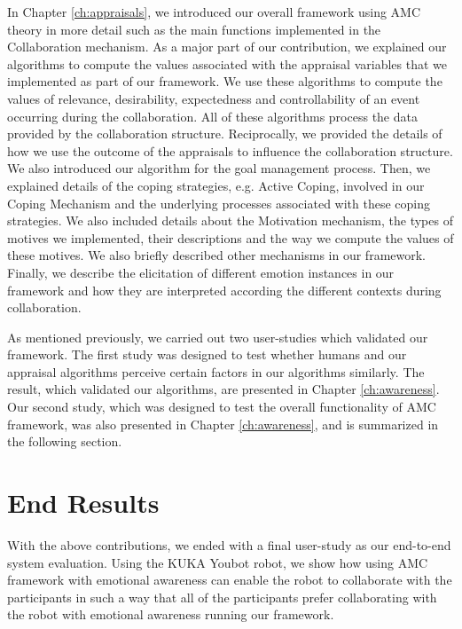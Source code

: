 \documentclass[12pt]{report}
\begin{document}
In Chapter \ref{ch:appraisals}, we introduced our overall framework using AMC
theory in more detail such as the main functions implemented in the
Collaboration mechanism. As a major part of our contribution, we explained our
algorithms to compute the values associated with the appraisal variables that we
implemented as part of our framework. We use these algorithms to compute the
values of relevance, desirability, expectedness and controllability of an event
occurring during the collaboration. All of these algorithms process the data
provided by the collaboration structure. Reciprocally, we provided the details
of how we use the outcome of the appraisals to influence the collaboration
structure. We also introduced our algorithm for the goal management process.
Then, we explained details of the coping strategies, e.g. Active Coping,
involved in our Coping Mechanism and the underlying processes associated with
these coping strategies. We also included details about the Motivation
mechanism, the types of motives we implemented, their descriptions and the
way we compute the values of these motives. We also briefly described other
mechanisms in our framework. Finally, we describe the elicitation of different
emotion instances in our framework and how they are interpreted according the
different contexts during collaboration. 

As mentioned previously, we carried out two user-studies which validated our
framework. The first study was designed to test whether humans and our appraisal
algorithms perceive certain factors in our algorithms similarly. The result,
which validated our algorithms, are presented in Chapter \ref{ch:awareness}. Our
second study, which was designed to test the overall functionality of AMC
framework, was also presented in Chapter \ref{ch:awareness}, and is summarized
in the following section.

\section{End Results}
With the above contributions, we ended with a final user-study as our end-to-end
system evaluation. Using the KUKA Youbot robot, we show how using AMC framework
with emotional awareness can enable the robot to collaborate with the
participants in such a way that all of the participants prefer collaborating
with the robot with emotional awareness running our framework.
\end{document}
